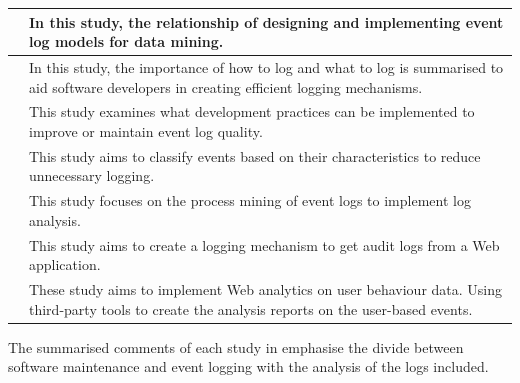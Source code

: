 \begin{xltabular}{\linewidth}{|l|X|}
	\hline \cite{Song2017} & In this study, the relationship of designing and implementing event log models for data mining.  \\

	\hline \cite{Zhu2015} & In this study, the importance of how to log and what to log is summarised to aid software developers in creating efficient logging mechanisms.  \\

	\hline \cite{Kherbouche2017} & This study examines what development practices can be implemented to improve or maintain event log quality.  \\

	\hline \cite{Fedaghi2010} & This study aims to classify events based on their characteristics to reduce unnecessary logging.  \\

	\hline \cite{Jans2012} & This study focuses on the process mining of event logs to implement log analysis.  \\

	\hline \cite{Hasiloglu2018,Slaninova2014,Dhanalakshmi2016} & This study aims to create a logging mechanism to get audit logs from a Web application. \\

	\hline \cite{Kocsis2012,Waqar2017,Paliouras1999} & These study aims to implement Web analytics on user behaviour data. Using third-party tools to create the analysis reports on the user-based events.  \\
\end{xltabular}	

The summarised comments of each study in  emphasise the divide between software maintenance and event logging with the analysis of the logs included.

\clearpage

